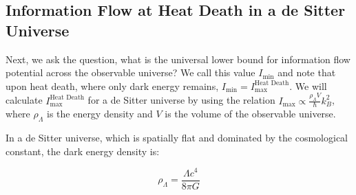 \documentclass[12pt]{article}
\begin{document}
\subsection{Information Flow at Heat Death in a de Sitter Universe}

Next, we ask the question, what is the universal lower bound for information flow potential across the observable universe? We call this value $I_{\text{min}}$ and note that upon heat death, where only dark energy remains, $I_{\text{min}} = I_{\text{max}}^{\text{Heat Death}}$. We will calculate $I_{\text{max}}^{\text{Heat Death}}$ for a de Sitter universe by using the relation $I_{\text{max}} \propto \frac{\rho_\Lambda V}{\hbar} k_B^2$, where $\rho_\Lambda$ is the energy density and $V$ is the volume of the observable universe.

In a de Sitter universe, which is spatially flat and dominated by the cosmological constant, the dark energy density is:

\begin{equation}
    \rho_\Lambda = \frac{\Lambda c^4}{8 \pi G}
\end{equation}
\end{document}
